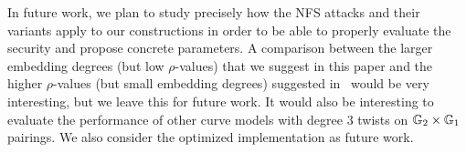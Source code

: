 In future work,
we plan to study precisely how the NFS attacks and their variants apply to our constructions in order to be able to
properly evaluate the security and propose concrete parameters.
A comparison between the larger embedding degrees (but low $\rho$-values) that we suggest
in this paper and the higher $\rho$-values (but small embedding degrees) suggested in~\cite{2018/FK} would be very interesting, but we leave this for future work.
It would also be interesting to evaluate the performance of other curve models with degree 3 twists on $\mathbb{G}_{2} \times \mathbb{G}_{1}$ pairings.
We also consider the optimized implementation as future work.





